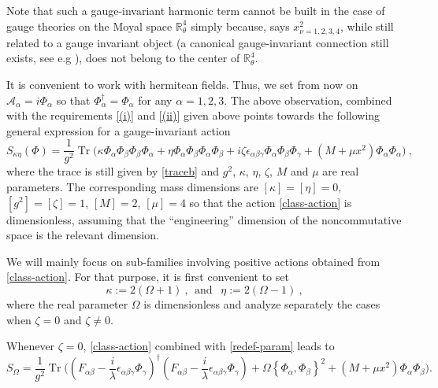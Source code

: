 \documentclass[a4paper,11pt,twoside]{article}
\numberwithin{equation}{section}
\DeclareMathOperator{\tr}{Tr}
\theoremstyle{nonumberplain}
\newcounter{and}
\begin{document}
%
Note that such a gauge-invariant harmonic term cannot be built in the case of gauge theories on the Moyal space $\mathbb{R}^4_\theta$ \cite{GWW} simply because, says $x_{\nu=1,2,3,4}^2$, while still related to a gauge invariant object (a canonical gauge-invariant connection still exists, see e.g \cite{cgmw-20}), does not belong to the center of $\mathbb{R}^4_\theta$. \par%
%
It is convenient to work with hermitean fields. Thus, we set from now on $\mathcal{A}_\alpha = i \Phi_\alpha$ so that $\Phi^\dag_\alpha = \Phi_\alpha$ for any $\alpha=1,2,3$. The above observation, combined with the requirements \ref{(i)} and \ref{(ii)} given above points towards the following general expression for a gauge-invariant action%
%
\begin{equation}
S_{\kappa\eta}(\Phi) = \frac{1}{g^2} \tr\bigg( \kappa \Phi_\alpha \Phi_\beta \Phi_\beta \Phi_\alpha + \eta \Phi_\alpha \Phi_\beta \Phi_\alpha \Phi_\beta + i \zeta \epsilon_{\alpha\beta\gamma} \Phi_\alpha \Phi_\beta \Phi_\gamma + \left(M+\mu x^2\right) \Phi_\alpha \Phi_\alpha \bigg) \ , \label{class-action}
\end{equation}
%
where the trace is still given by \eqref{traceb} and $g^2$, $\kappa$, $\eta$, $\zeta$, $M$ and $\mu$ are real parameters. The corresponding mass dimensions are $[\kappa]=[\eta]=0$, $[g^2]=[\zeta]=1$, $[M]=2$, $[\mu]=4$ so that the action \eqref{class-action} is dimensionless, assuming that the ``engineering'' dimension of the noncommutative space is the relevant dimension.\par%
%
We will mainly focus on sub-families involving positive actions obtained from \eqref{class-action}. For that purpose, it is first convenient to set%
%
\begin{equation}
\kappa := 2(\Omega+1) \ , \ \ \mbox{and } \ \ \eta := 2(\Omega-1) \ , \label{redef-param}
\end{equation}
%
where the real parameter $\Omega$ is dimensionless and analyze separately the cases when $\zeta=0$ and $\zeta\ne0$.\par%
%
Whenever $\zeta=0$, \eqref{class-action} combined with \eqref{redef-param} leads to%
%
\begin{equation}
S_\Omega = \frac{1}{g^2} \tr\bigg(\left(F_{\alpha\beta} - \frac{i}{\lambda} \epsilon_{\alpha\beta\gamma} \Phi_\gamma\right)^\dag \left(F_{\alpha\beta} - \frac{i}{\lambda} \epsilon_{\alpha\beta\gamma} \Phi_\gamma\right) + \Omega\left\{\Phi_\alpha,\Phi_\beta\right\}^2 + \left(M+\mu x^2\right) \Phi_\alpha \Phi_\beta \bigg) \label{zeta=0}.
\end{equation}
\end{document}
